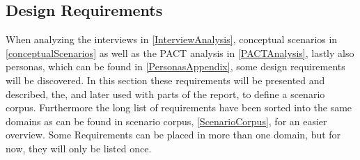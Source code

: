 \subsection{Design Requirements} \label{DesignRequirements}
When analyzing the interviews in \cref{InterviewAnalysis}, conceptual scenarios in \cref{conceptualScenarios} as well as the PACT analysis in \cref{PACTAnalysis}, lastly also personas, which can be found in \cref{PersonasAppendix}, some design requirements will be discovered. In this section these requirements will be presented and described, the, and later used with parts of the report, to define a scenario corpus. Furthermore the long list of requirements have been sorted into the same domains as can be found in scenario corpus, \cref{ScenarioCorpus}, for an easier overview. Some Requirements can be placed in more than one domain, but for now, they will only be listed once.
